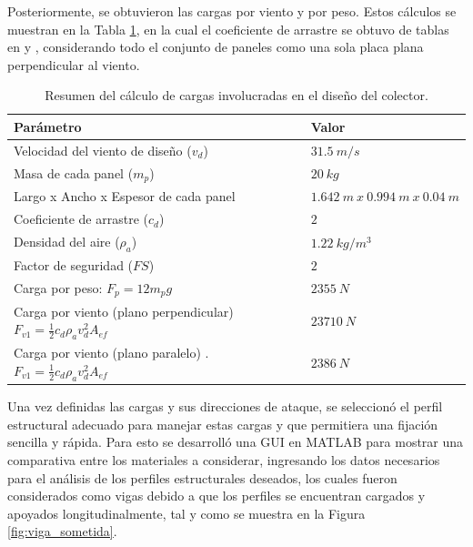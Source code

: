 Posteriormente, se obtuvieron las cargas por viento y por peso. Estos cálculos se muestran en la Tabla \ref{tab:carga_colector}, en la cual el coeficiente de arrastre se obtuvo de tablas en \cite{DDEs4} y \cite{DDEs5}, considerando todo el conjunto de paneles como una sola placa plana perpendicular al viento.
\begin{table}[H]
  \centering
  \caption{Resumen del cálculo de cargas involucradas en el diseño del colector.}
    \begin{tabular}{|p{7cm}|l|}
    \hline
    \textbf{Parámetro} & \textbf{Valor} \\
    \hline \hline
    Velocidad del viento de diseño ($ v_d $) & $ 31.5\ m/s $ \\
    \hline
    Masa de cada panel ($ m_p $) & $ 20\ kg $ \\
    \hline
    Largo x Ancho x Espesor de cada panel & $1.642\ m\ x\ 0.994\    m\ x\ 0.04\ m $ \\
    \hline
    Coeficiente de arrastre ($ c_d $) & $ 2 $ \\
    \hline
    Densidad del aire ($ \rho_a $) & $ 1.22\ kg/m^3 $ \\
    \hline
    Factor de seguridad ($ FS $)  & $ 2 $ \\
    \hline
    Carga por peso: $ F_p= 12 m_p g $ & $ 2355\ N $ \\
    \hline
    Carga por viento (plano perpendicular) \cite{DDEs4} \newline{} $ F_{v1}=\frac{1}{2} c_d \rho_a v_d^2 A_{ef} $ & $ 23710\ N $ \\
    \hline
    Carga por viento (plano paralelo) \cite{DDEs4} \newline{} .$ F_{v1}=  \frac{1}{2} c_d \rho_a v_d^2 A_{ef} $ & $ 2386\ N $ \\
    \hline
    \end{tabular}%
  \label{tab:carga_colector}%
\end{table}%

\newpage
Una vez definidas las cargas y sus direcciones de ataque, se seleccionó el perfil estructural adecuado para manejar estas cargas y que permitiera una fijación sencilla y rápida. Para esto se desarrolló una GUI en MATLAB para mostrar una comparativa entre los materiales a considerar, ingresando los datos necesarios para el análisis de los perfiles estructurales deseados, los cuales fueron considerados como vigas debido a que los perfiles se encuentran cargados y apoyados longitudinalmente, tal y como se muestra en la Figura \ref{fig:viga_sometida}.

